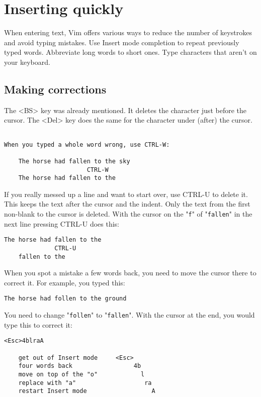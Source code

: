 \section{Inserting quickly}
When entering text, Vim offers various ways to reduce the number of keystrokes and avoid typing mistakes.
Use Insert mode completion to repeat previously typed words.
Abbreviate long words to short ones.
Type characters that aren't on your keyboard.
\subsection{Making corrections}
The <BS> key was already mentioned.
It deletes the character just before the cursor.
The <Del> key does the same for the character under (after) the cursor.

\begin{Verbatim}[samepage=true]

When you typed a whole word wrong, use CTRL-W:

    The horse had fallen to the sky 
                       CTRL-W
    The horse had fallen to the 
\end{Verbatim}

If you really messed up a line and want to start over, use CTRL-U to delete it.
This keeps the text after the cursor and the indent.
Only the text from the first non-blank to the cursor is deleted.
With the cursor on the "\verb!f!" of "\verb!fallen!" in the next line pressing CTRL-U does this:

\begin{Verbatim}[samepage=true]
    The horse had fallen to the 
              CTRL-U
    fallen to the 
\end{Verbatim}

When you spot a mistake a few words back, you need to move the cursor there to correct it.
For example, you typed this:

\begin{Verbatim}[samepage=true]
    The horse had follen to the ground 
\end{Verbatim}

You need to change "\verb!follen!" to "\verb!fallen!".
With the cursor at the end, you would type this to correct it:

\begin{Verbatim}[samepage=true]
                               <Esc>4blraA

    get out of Insert mode     <Esc>
    four words back                 4b
    move on top of the "o"            l
    replace with "a"                   ra
    restart Insert mode                  A
\end{Verbatim}


